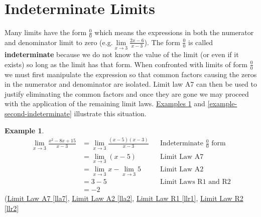 \documentclass[10pt,oneside,]{book}
\newcommand{\terminology}[1]{\textbf{#1}}
\theoremstyle{plain}
\theoremstyle{definition}
\newtheorem{example}[theorem]{Example}
\numberwithin{equation}{section}
\begin{document}
\section[Indeterminate Limits]{Indeterminate Limits}\label{section-indeterminate-limits}
Many limits have the form \(\frac{0}{0}\) which means the expressions in both the numerator and denominator limit to zero (e.g.\@\(\lim\limits_{x\to3}\frac{2x-6}{x-3}\)). The form \(\frac{0}{0}\) is called \terminology{indeterminate} because we do not know the value of the limit (or even if it exists) so long as the limit has that form. When confronted with limits of form \(\frac{0}{0}\) we must first manipulate the expression so that common factors causing the zeros in the numerator and denominator are isolated. Limit law A7 can then be used to justify eliminating the common factors and once they are gone we may proceed with the application of the remaining limit laws. \hyperref[example-first-indeterminate]{Examples \ref{example-first-indeterminate}} and \hyperref[example-second-indeterminate]{\ref{example-second-indeterminate}} illustrate this situation.%
\begin{example}\label{example-first-indeterminate}
\begin{align*}
\lim_{x\to3}\frac{x^2-8x+15}{x-3}&=\lim_{x\to3}\frac{(x-5)(x-3)}{x-3}&&\text{Indeterminate $\frac{0}{0}$ form}\\
&=\lim_{x\to3}(x-5)&&\text{Limit Law A7}\\
&=\lim_{x\to3}x-\lim_{x\to3}5&&\text{Limit Law A2}\\
&=3-5&&\text{Limit Laws R1 and R2}\\
&=-2
\end{align*}(\hyperref[lla7]{Limit Law A7 \ref{lla7}}, \hyperref[lla2]{Limit Law A2 \ref{lla2}}, \hyperref[llr1]{Limit Law R1 \ref{llr1}}, \hyperref[llr2]{Limit Law R2 \ref{llr2}}%
\end{example}
\end{document}
